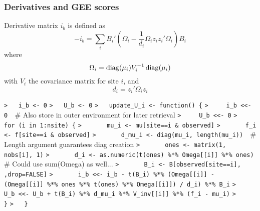 \documentclass[a4paper]{article}
\begin{document}
\subsubsection{Derivatives and GEE scores}
\label{Hessian}\label{Scoring}
Derivative matrix $i_b$ is defined as
\begin{equation}
  -i_b = \sum_i B_i' \left(\Omega_i - \frac{1}{d_i}\Omega_i z_i z_i' \Omega_i\right) B_i \label{i_b}
\end{equation}
where
\begin{equation}
  \Omega_i = \operatorname{diag}(\mu_i) V_i^{-1} \operatorname{diag}(\mu_i) \label{Omega_i}
\end{equation}
with $V_i$ the covariance matrix for site $i$, and
\begin{equation}
  d_i = z_i' \Omega_i z_i \label{d_i}
\end{equation}\par
\verb~>   i_b <- 0~\newline
\verb~>   U_b <- 0~\newline
\verb~>   update_U_i <- function() {~\newline
\verb~>     i_b <<- 0  ~{\sffamily\# Also store in outer environment for later retrieval}\newline
\verb~>     U_b <<- 0~\newline
\verb~>     for (i in 1:nsite) {~\newline
\verb~>       mu_i <- mu[site==i & observed]~\newline
\verb~>       f_i  <- f[site==i & observed]~\newline
\verb~>       d_mu_i <- diag(mu_i, length(mu_i))  ~{\sffamily\# Length argument guarantees diag creation}\newline
\verb~>       ones <- matrix(1, nobs[i], 1)~\newline
\verb~>       d_i <- as.numeric(t(ones) %*% Omega[[i]] %*% ones)  ~{\sffamily\# Could use sum(Omega) as well...}\newline
\verb~>       B_i <- B[observed[site==i], ,drop=FALSE]~\newline
\verb~>       i_b <<- i_b - t(B_i) %*% (Omega[[i]] - (Omega[[i]] %*% ones %*% t(ones) %*% Omega[[i]]) / d_i) %*% B_i~\newline
\verb~>       U_b <<- U_b + t(B_i) %*% d_mu_i %*% V_inv[[i]] %*% (f_i - mu_i)~\newline
\verb~>     }~\newline
\verb~>   }~\par
\end{document}
